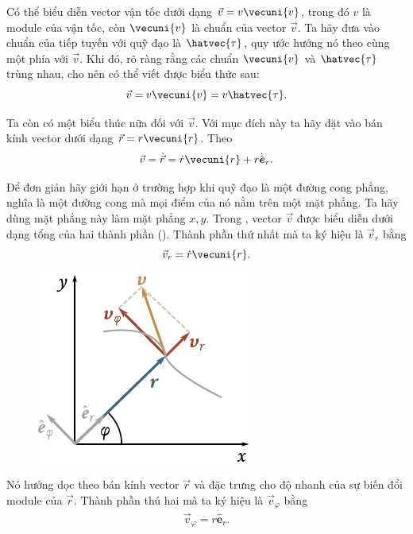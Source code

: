 Có thể biểu diễn vector vận tốc dưới dạng $\vec{v}=v\vecuni{v}$, trong đó $v$ là module của vận tốc, còn $\vecuni{v}$ là chuẩn của vector $\vec{v}$. Ta hãy đưa vào chuẩn của tiếp tuyến với quỹ đạo là $\hatvec{\tau}$, quy ước hướng nó theo cùng một phía với $\vec{v}$. Khi đó, rõ ràng rằng các chuẩn $\vecuni{v}$ và $\hatvec{\tau}$ trùng nhau, cho nên có thể viết được biểu thức sau:
\begin{equation}\label{eq:1_67}
\vec{v} = v\vecuni{v} = v\hatvec{\tau}.
\end{equation}

Ta còn có một biểu thúc nữa đối với $\vec{v}$. Với mục đích này ta hãy đặt vào  bán kính vector dưới dạng $\vec{r}=r\vecuni{r}$. Theo 
\begin{equation}\label{eq:1_68}
\vec{v} = \dot{\vec{r}} = \dot{r}\vecuni{r} + r\dot{\hat{\boldsymbol{e}}}_r.
\end{equation}

\noindent
Để đơn giản hãy giới hạn ở trường hợp khi quỹ đạo là một đường cong phẳng, nghĩa là một đường cong mà mọi điểm của nó nằm trên một mặt phẳng. Ta hãy dùng mặt phẳng này làm mặt phẳng $x, y$. Trong , vector $\vec{v}$ được biểu diễn dưới dạng tổng của hai thành phần (). Thành phần thứ nhất mà ta ký hiệu là $\vec{v}_r$ bằng
\begin{equation}\label{eq:1_69}
\vec{v}_r = \dot{r}\vecuni{r}.
\end{equation}

\begin{figure}[!htb]
	\begin{center}
		\includegraphics[scale=1]{figures/ch_01/fig_1_25.pdf}
		\caption[]{}
		\label{fig:1_25}
	\end{center}
\end{figure}


\noindent
Nó hướng dọc theo bán kính vector $\vec{r}$ và đặc trưng cho độ nhanh của sự biến đổi module của $\vec{r}$. Thành phần thú hai mà ta ký hiệu là $\vec{v}_{\varphi}$ bằng
\begin{equation}\label{eq:1_70}
\vec{v}_{\varphi} = r\dot{\hat{\boldsymbol{e}}}_r.
\end{equation}

